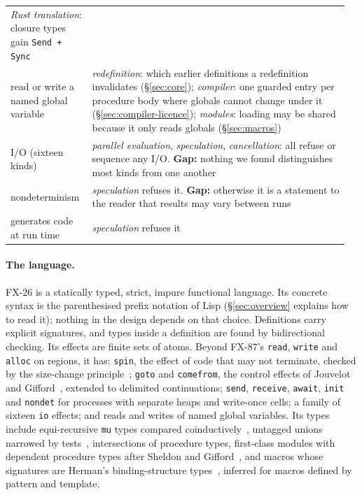 \documentclass[acmsmall,screen,review]{acmart}
\newcommand{\cd}[1]{\texttt{#1}}
\newcommand{\fx}{FX-26}
\begin{document}
\begin{table}[t]
\begin{tabular}{@{}p{0.23\linewidth}p{0.73\linewidth}@{}}
\emph{Rust translation}: closure types gain \cd{Send + Sync}\\[3pt]
read or write a named global variable &
\emph{redefinition}: which earlier definitions a redefinition invalidates (\S\ref{sec:core});
\emph{compiler}: one guarded entry per procedure body where globals cannot change under it (\S\ref{sec:compiler-licence});
\emph{modules}: loading may be shared because it only reads globals (\S\ref{sec:macros})\\[3pt]
I/O (sixteen kinds) &
\emph{parallel evaluation}, \emph{speculation}, \emph{cancellation}: all refuse or sequence any I/O.
\textbf{Gap:} nothing we found distinguishes most kinds from one another\\[3pt]
nondeterminism &
\emph{speculation} refuses it. \textbf{Gap:} otherwise it is a statement to the reader that results may vary between runs\\[3pt]
generates code at run time &
\emph{speculation} refuses it\\
\bottomrule
\end{tabular}
\end{table}

\paragraph{The language.} \fx{} is a statically typed, strict,
impure functional language. Its concrete syntax is the parenthesised
prefix notation of Lisp (\S\ref{sec:overview} explains how to read it);
nothing in the design depends on that choice. Definitions carry
explicit signatures, and types inside a definition are found by
bidirectional checking. Its effects are finite sets of atoms. Beyond FX-87's \cd{read},
\cd{write} and \cd{alloc} on regions, it has: \cd{spin}, the effect of
code that may not terminate, checked by the size-change
principle~\cite{size-change}; \cd{goto} and \cd{comefrom}, the control
effects of Jouvelot and Gifford~\cite{jouvelot-gifford}, extended to
delimited continuations; \cd{send}, \cd{receive}, \cd{await},
\cd{init} and \cd{nondet} for processes with separate heaps and
write-once cells; a family of sixteen \cd{io} effects; and reads and
writes of named global variables. Its types include equi-recursive
\cd{mu} types compared coinductively~\cite{amadio-cardelli,brandt-henglein},
untagged unions narrowed by tests~\cite{typed-scheme}, intersections of
procedure types, first-class modules with dependent procedure types
after Sheldon and Gifford~\cite{sheldon-gifford}, and macros whose
signatures are Herman's binding-structure types~\cite{herman-thesis},
inferred for macros defined by pattern and template.
\end{document}
